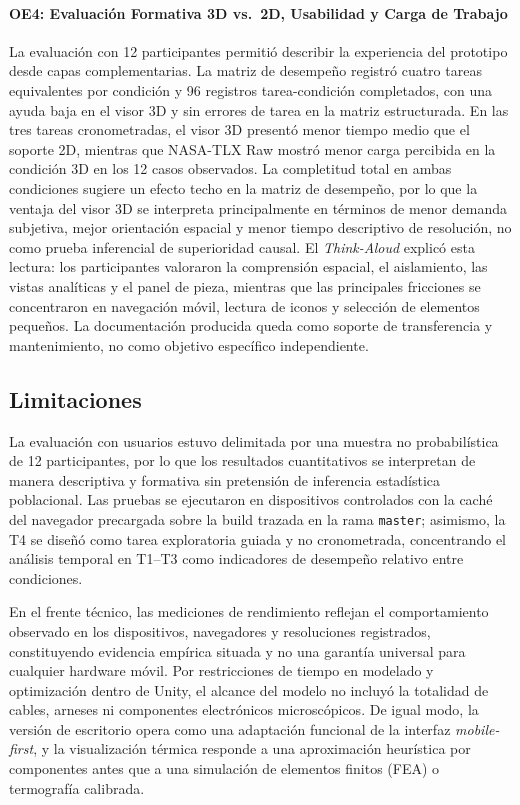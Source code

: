 \paragraph{OE4: Evaluación Formativa 3D vs.\ 2D, Usabilidad y Carga de Trabajo} La evaluación con 12 participantes permitió describir la experiencia del prototipo desde capas complementarias. La matriz de desempeño registró cuatro tareas equivalentes por condición y 96 registros tarea-condición completados, con una ayuda baja en el visor 3D y sin errores de tarea en la matriz estructurada. En las tres tareas cronometradas, el visor 3D presentó menor tiempo medio que el soporte 2D, mientras que NASA-TLX Raw mostró menor carga percibida en la condición 3D en los 12 casos observados. La completitud total en ambas condiciones sugiere un efecto techo en la matriz de desempeño, por lo que la ventaja del visor 3D se interpreta principalmente en términos de menor demanda subjetiva, mejor orientación espacial y menor tiempo descriptivo de resolución, no como prueba inferencial de superioridad causal. El \textit{Think-Aloud} explicó esta lectura: los participantes valoraron la comprensión espacial, el aislamiento, las vistas analíticas y el panel de pieza, mientras que las principales fricciones se concentraron en navegación móvil, lectura de iconos y selección de elementos pequeños. La documentación producida queda como soporte de transferencia y mantenimiento, no como objetivo específico independiente.

\subsection{Limitaciones}

La evaluación con usuarios estuvo delimitada por una muestra no probabilística de 12 participantes, por lo que los resultados cuantitativos se interpretan de manera descriptiva y formativa sin pretensión de inferencia estadística poblacional. Las pruebas se ejecutaron en dispositivos controlados con la caché del navegador precargada sobre la build trazada en la rama \texttt{master}; asimismo, la T4 se diseñó como tarea exploratoria guiada y no cronometrada, concentrando el análisis temporal en T1--T3 como indicadores de desempeño relativo entre condiciones.

En el frente técnico, las mediciones de rendimiento reflejan el comportamiento observado en los dispositivos, navegadores y resoluciones registrados, constituyendo evidencia empírica situada y no una garantía universal para cualquier hardware móvil. Por restricciones de tiempo en modelado y optimización dentro de Unity, el alcance del modelo no incluyó la totalidad de cables, arneses ni componentes electrónicos microscópicos. De igual modo, la versión de escritorio opera como una adaptación funcional de la interfaz \textit{mobile-first}, y la visualización térmica responde a una aproximación heurística por componentes antes que a una simulación de elementos finitos (FEA) o termografía calibrada.

